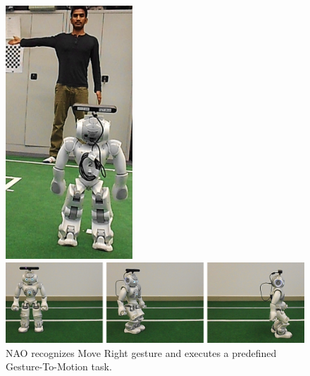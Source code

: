 \begin{figure}
	[h] 
	\begin{minipage}
		{1 
		\textwidth} \centering 
		\includegraphics[height=95mm]{figures/result/usr-move-right.jpg} \caption*{} 
	\end{minipage}
	\begin{minipage}
		{1 
		\textwidth} \hspace{-5 mm} 
		\includegraphics[width=160mm]{figures/result/nao-gm-move-right.jpg} 
	\end{minipage}
	\caption{NAO recognizes Move Right gesture and executes a predefined Gesture-To-Motion task.} \label{res:gm:move:right} 
\end{figure}
